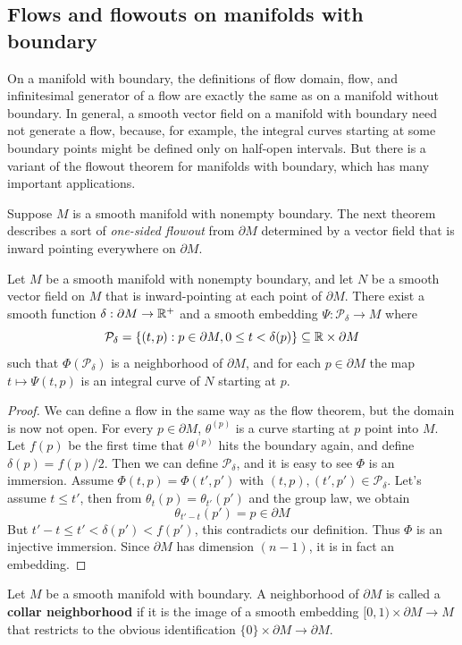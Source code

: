 \subsection{Flows and flowouts on manifolds with boundary}
On a manifold with boundary, the definitions of flow domain, flow, and infinitesimal generator of a flow are exactly the same as on a manifold without boundary. In general, a smooth vector field on a manifold with boundary need not generate a flow, because, for example, the integral curves starting at some boundary points might be defined only on half-open intervals. But there is a variant of the flowout theorem for manifolds with boundary, which has many important applications.\par
Suppose $M$ is a smooth manifold with nonempty boundary. The next theorem
describes a sort of \textit{one-sided flowout} from $\partial M$ determined by a vector field that is inward pointing everywhere on $\partial M$.
\begin{theorem}\label{flowout boundary}
Let $M$ be a smooth manifold with nonempty boundary, and let $N$ be a smooth vector field on $M$ that is inward-pointing at each point of $\partial M$. There exist a smooth function $\delta:\partial M\to\mathbb{R}^+$ and a smooth embedding $\varPsi:\mathcal{P}_\delta\to M$ where 
\[\mathcal{P}_\delta=\{(t,p):p\in\partial M,0\leq t<\delta(p)\}\subseteq\mathbb{R}\times\partial M\] 
such that $\varPhi(\mathcal{P}_\delta)$ is a neighborhood of $\partial M$, and for each $p\in\partial M$ the map $t\mapsto \varPsi(t,p)$ is an integral curve of $N$ starting at $p$.
\end{theorem}
\begin{proof}
We can define a flow in the same way as the flow theorem, but the domain is now not open. For every $p\in\partial　M$, $\theta^{(p)}$ is a curve starting at $p$ point into $M$. Let $f(p)$ be the first time that $\theta^{(p)}$ hits the boundary again, and define $\delta(p)=f(p)/2$. Then we can define $\mathcal{P}_\delta$, and it is easy to see $\varPhi$ is an immersion. Assume $\varPhi(t,p)=\varPhi(t',p')$ with $(t,p),(t',p')\in\mathcal{P}_\delta$. Let's assume $t\leq t'$, then from $\theta_{t}(p)=\theta_{t'}(p')$ and the group law, we obtain
\[\theta_{t'-t}(p')=p\in\partial M\]
But $t'-t\leq t'<\delta(p')<f(p')$, this contradicts our definition. Thus $\varPhi$ is an injective immersion. Since $\partial M$ has dimension $(n-1)$, it is in fact an embedding.
\end{proof}
Let $M$ be a smooth manifold with boundary. A neighborhood of $\partial M$ is called a \textbf{collar neighborhood} if it is the image of a smooth embedding $[0,1)\times\partial M\to M$ that restricts to the obvious identification $\{0\}\times\partial M\to\partial M$.
